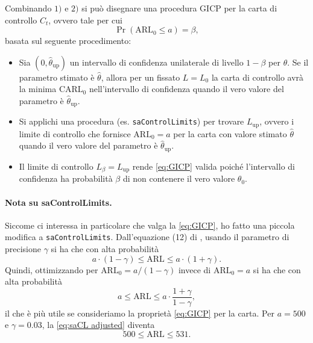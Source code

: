 \documentclass{article}
\begin{document}
Combinando $ 1)$ e $ 2)$ si può disegnare una procedura GICP per la carta di controllo $ C_{t}$, ovvero tale per cui
\begin{equation}
    \label{eq:GICP}
    \Pr(\text{ARL}_0 \le a) = \beta,
\end{equation}
 basata sul seguente procedimento:
\begin{itemize}
    \item Sia $(0, \widehat{\theta}_\text{up})$ un intervallo di confidenza unilaterale di livello $ 1 - \beta$ per $ \theta$.
        Se il parametro stimato è $ \widehat{\theta}$, allora per un fissato $ L = L_0$ la carta di controllo avrà la minima $ \text{CARL}_0$ nell'intervallo di confidenza quando il vero valore del parametro è $\widehat{\theta}_\text{up}$.

    \item Si applichi una procedura (es. \texttt{saControlLimits}) per trovare $ L_\text{up}$, ovvero i limite di controllo che fornisce $ \text{ARL}_0 = a$ per la carta con valore stimato $ \widehat{\theta}$ quando il vero valore del parametro è $ \widehat{\theta}_\text{up}$.

    \item Il limite di controllo $ L_\beta = L_\text{up} $ rende \eqref{eq:GICP} valida poiché l'intervallo di confidenza ha probabilità $ \beta$ di non contenere il vero valore $ \theta_0$.
\end{itemize}

\paragraph{Nota su saControlLimits.} Siccome ci interessa in particolare che valga la \eqref{eq:GICP}, ho fatto una piccola modifica a \texttt{saControlLimits}.
Dall'equazione (12) di \citet{capizzi2016}, usando il parametro di precisione $ \gamma$ si ha che con alta probabilità
\[
    a\cdot (1-\gamma) \le \text{ARL} \le a\cdot (1+\gamma).
\]
Quindi, ottimizzando per $ \text{ARL}_0 = a /(1-\gamma)$ invece di $ \text{ARL}_0 = a$ si ha che con alta probabilità
\begin{equation}
    \label{eq:saCL adjusted}
    a \le \text{ARL} \le a\cdot \frac{1+\gamma}{1 - \gamma},
\end{equation}
il che è più utile se consideriamo la proprietà \eqref{eq:GICP} per la carta.
Per $ a = 500$ e $ \gamma = 0.03$, la \eqref{eq:saCL adjusted} diventa
\[
    500 \le \text{ARL} \le 531.
\]
\end{document}
